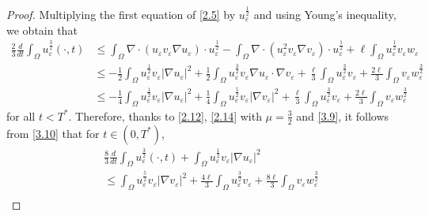 \documentclass[12pt]{article}
\theoremstyle{plain}
\theoremstyle{definition}
\numberwithin{equation}{section}
\begin{document}
\begin{proof}
 Multiplying the first equation of \eqref{2.5} by $u_\varepsilon^{\frac{1}{2}}$ and using Young's inequality, we obtain that
\begin{equation}\label{3.10}
    \begin{split}
        \frac{2}{3}\frac{d}{dt}\int_\Omega u_\varepsilon^{\frac{3}{2}}(\cdot,t)
        &\leq\int_\Omega\nabla\cdot(u_\varepsilon v_\varepsilon\nabla u_\varepsilon)\cdot u_\varepsilon^{\frac{1}{2}}-\int_\Omega\nabla\cdot(u_\varepsilon^2v_\varepsilon\nabla v_\varepsilon)\cdot u_\varepsilon^{\frac{1}{2}}+\ell\int_\Omega u_\varepsilon ^{\frac{1}{2}}v_\varepsilon w_\varepsilon\\
        &\leq-\frac12\int_\Omega u_\varepsilon^{\frac{1}{2}}v_\varepsilon|\nabla u_\varepsilon|^2+\frac12\int_\Omega u_\varepsilon^{\frac{3}{2}}v_\varepsilon\nabla u_\varepsilon\cdot\nabla v_\varepsilon+\frac{\ell}{3}\int_\Omega u_\varepsilon ^{\frac{3}{2}}v_\varepsilon+\frac{2\ell}{3}\int_\Omega v_\varepsilon w_\varepsilon^{\frac3 2}\\
        &\leq-\frac{1}{4}\int_\Omega u_\varepsilon^{\frac{1}{2}}v_\varepsilon|\nabla u_\varepsilon|^2+\frac{1}{4}\int_\Omega u_\varepsilon^{\frac{5}{2}}v_\varepsilon|\nabla v_\varepsilon|^2+\frac{\ell}{3}\int_\Omega u_\varepsilon ^{\frac{3}{2}}v_\varepsilon+\frac{2\ell}{3}\int_\Omega v_\varepsilon w_\varepsilon^{\frac3 2}
        \end{split}
\end{equation}
for all $ t<T^*$. Therefore, thanks to \eqref{2.12}, \eqref{2.14} with $\mu=\frac3 2$ and \eqref{3.9},  it follows from \eqref{3.10} that for $ t\in (0,T^*)$,
\begin{align}\label{3.11}
        ~&\frac{8}{3}\frac{d}{dt}\int_\Omega u_\varepsilon^{\frac{3}{2}}(\cdot,t)+\int_\Omega u_\varepsilon^{\frac{1}{2}}v_\varepsilon|\nabla u_\varepsilon|^2\nonumber\\
        &\leq\int_\Omega u_\varepsilon^{\frac{5}{2}}v_\varepsilon|\nabla v_\varepsilon|^2+\frac{4\ell}{3}\int_\Omega u_\varepsilon ^{\frac{3}{2}}v_\varepsilon+\frac{8\ell}{3}\int_\Omega v_\varepsilon w_\varepsilon^{\frac3 2}\nonumber\\

\end{align}
\end{proof}
\end{document}
